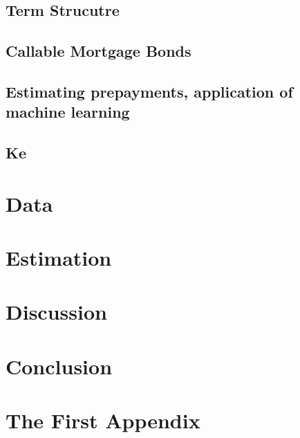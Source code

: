 \documentclass[12pt,twoside]{reedthesis}
\begin{document}
\hypertarget{term-strucutre}{%
\section{Term Strucutre}\label{term-strucutre}}

\hypertarget{callable-mortgage-bonds}{%
\section{Callable Mortgage Bonds}\label{callable-mortgage-bonds}}

\hypertarget{estimating-prepayments-application-of-machine-learning}{%
\section{Estimating prepayments, application of machine learning}\label{estimating-prepayments-application-of-machine-learning}}

\hypertarget{ke}{%
\section{Ke}\label{ke}}

\hypertarget{data}{%
\chapter{Data}\label{data}}

\hypertarget{estimation}{%
\chapter{Estimation}\label{estimation}}

\hypertarget{discussion}{%
\chapter*{Discussion}\label{discussion}}

\hypertarget{conclusion}{%
\chapter*{Conclusion}\label{conclusion}}

\appendix

\hypertarget{the-first-appendix}{%
\chapter{The First Appendix}\label{the-first-appendix}}
\end{document}
